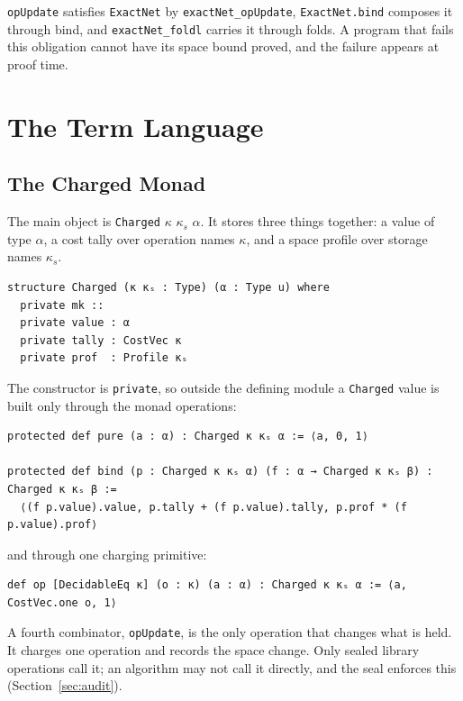 \documentclass[acmsmall,nonacm]{acmart}
\begin{document}
\lstinline{opUpdate} satisfies \lstinline{ExactNet} by \lstinline{exactNet_opUpdate}, \lstinline{ExactNet.bind} composes it through bind, and \lstinline{exactNet_foldl} carries it through folds.
A program that fails this obligation cannot have its space bound proved, and the failure appears at proof time.


\section{The Term Language}\label{sec:term-language}

\subsection{The Charged Monad}\label{sec:charged}

The main object is \lstinline{Charged} $\kappa$ $\kappa_s$ $\alpha$.
It stores three things together: a value of type $\alpha$, a cost tally over operation names $\kappa$, and a space profile over storage names $\kappa_s$.

\begin{lstlisting}
structure Charged (κ κₛ : Type) (α : Type u) where
  private mk ::
  private value : α
  private tally : CostVec κ
  private prof  : Profile κₛ
\end{lstlisting}

The constructor is \lstinline{private}, so outside the defining module a \lstinline{Charged} value is built only through the monad operations:

\begin{lstlisting}
protected def pure (a : α) : Charged κ κₛ α := ⟨a, 0, 1⟩

protected def bind (p : Charged κ κₛ α) (f : α → Charged κ κₛ β) : Charged κ κₛ β :=
  ⟨(f p.value).value, p.tally + (f p.value).tally, p.prof * (f p.value).prof⟩
\end{lstlisting}

and through one charging primitive:

\begin{lstlisting}
def op [DecidableEq κ] (o : κ) (a : α) : Charged κ κₛ α := ⟨a, CostVec.one o, 1⟩
\end{lstlisting}

A fourth combinator, \lstinline{opUpdate}, is the only operation that changes what is held.
It charges one operation and records the space change.
Only sealed library operations call it; an algorithm may not call it directly, and the seal enforces this (Section~\ref{sec:audit}).
\end{document}
